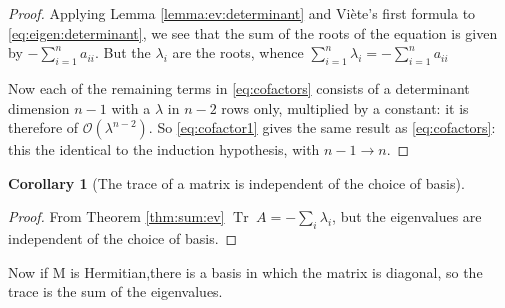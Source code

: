 \documentclass[]{article}
\newtheorem{cor}[thm]{Corollary}
\DeclareMathOperator{\Tr}{Tr \;}
\begin{document}
\begin{proof}
		Applying Lemma \ref{lemma:ev:determinant} and Vi\`ete's first formula\cite{enwiki:1030161470} to \eqref{eq:eigen:determinant}, we see that the sum of the roots of the equation is given by $-\sum_{i=1}^{n}a_{ii}$. But the $\lambda_i$ are the roots, whence $\sum_{i=1}^{n}\lambda_i=-\sum_{i=1}^{n}a_{ii}$


		Now each of the remaining terms in \eqref{eq:cofactors} consists of a determinant dimension $n-1$ with a $\lambda$ in $n-2$ rows only, multiplied by a constant: it is therefore of $\mathcal{O}(\lambda^{n-2})$. So \eqref{eq:cofactor1} gives the same result as \eqref{eq:cofactors}: this the identical to the induction hypothesis, with $n-1\rightarrow n$.
		
	
\end{proof}

\begin{cor}[The trace of a matrix is independent of the choice of basis]\end{cor}
\begin{proof}
	From Theorem \ref{thm:sum:ev} $\Tr A = - \sum_i \lambda_i$, but the eigenvalues are independent of the choice of basis.
\end{proof}

Now if M is Hermitian,there is a basis in which the matrix is diagonal, so the trace is the sum of the eigenvalues.
\end{document}
